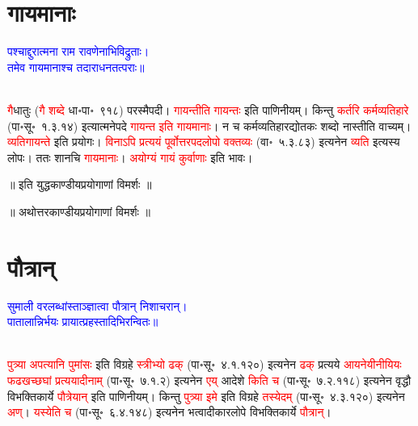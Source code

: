 \section[गायमानाः]{गायमानाः}
\centering\textcolor{blue}{पश्चाद्दुरात्मना राम रावणेनाभिविद्रुताः।\nopagebreak\\
तमेव गायमानाश्च तदाराधनतत्पराः॥}\nopagebreak\\
\\
\begin{sloppypar}\justifying\noindent\hspace{10mm} \textcolor{red}{गै}\-धातुः (\textcolor{red}{गै शब्दे} धा॰पा॰~९१८) परस्मैपदी। \textcolor{red}{गायन्तीति गायन्तः} इति पाणिनीयम्। किन्तु \textcolor{red}{कर्तरि कर्म\-व्यतिहारे} (पा॰सू॰~१.३.१४) इत्यात्मनेपदे \textcolor{red}{गायन्त इति गायमानाः}। न च कर्म\-व्यतिहार\-द्योतकः शब्दो नास्तीति वाच्यम्। \textcolor{red}{व्यतिगायन्ते} इति प्रयोगः। \textcolor{red}{विनाऽपि प्रत्ययं पूर्वोत्तर\-पद\-लोपो वक्तव्यः} (वा॰~५.३.८३) इत्यनेन \textcolor{red}{व्यति} इत्यस्य लोपः। ततः शानचि \textcolor{red}{गायमानाः}। \textcolor{red}{अयोग्यं गायं कुर्वाणाः} इति भावः।\end{sloppypar}
\vspace{2mm}
\centering ॥ इति युद्धकाण्डीयप्रयोगाणां विमर्शः ॥\nopagebreak\\
\vspace{4mm}
{}
\centering ॥ अथोत्तरकाण्डीयप्रयोगाणां विमर्शः ॥\nopagebreak\\
\section[पौत्रान्]{पौत्रान्}
\centering\textcolor{blue}{सुमाली वरलब्धांस्ताञ्ज्ञात्वा पौत्रान् निशाचरान्।\nopagebreak\\
पातालान्निर्भयः प्रायात्प्रहस्तादिभिरन्वितः॥}\nopagebreak\\
\\
\begin{sloppypar}\justifying\noindent\hspace{10mm} \textcolor{red}{पुत्र्या अपत्यानि पुमांसः} इति विग्रहे \textcolor{red}{स्त्रीभ्यो ढक्} (पा॰सू॰~४.१.१२०) इत्यनेन \textcolor{red}{ढक्} प्रत्यये \textcolor{red}{आयनेयीनीयियः
फढखच्छघां प्रत्ययादीनाम्} (पा॰सू॰~७.१.२) इत्यनेन \textcolor{red}{एय्} आदेशे \textcolor{red}{किति च} (पा॰सू॰~७.२.११८) इत्यनेन वृद्धौ विभक्ति\-कार्ये \textcolor{red}{पौत्रेयान्} इति पाणिनीयम्। किन्तु \textcolor{red}{पुत्र्या इमे} इति विग्रहे \textcolor{red}{तस्येदम्} (पा॰सू॰~४.३.१२०) इत्यनेन \textcolor{red}{अण्}। \textcolor{red}{यस्येति च} (पा॰सू॰~६.४.१४८) इत्यनेन भत्वादीकार\-लोपे विभक्तिकार्ये \textcolor{red}{पौत्रान्}।\end{sloppypar}
